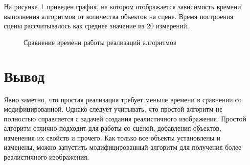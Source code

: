 На рисунке~\ref{fig:graph} приведен график, на котором отображается зависимость времени выполнения алгоритмов от количества объектов на сцене.  Время построения сцены рассчитывалось как среднее значение из 20 измерений.
\begin{figure}[ht!]
	\begin{center}
		\captionsetup{singlelinecheck = false, justification=centerfirst}
		\centering
		\caption{Сравнение времени работы реализаций алгоритмов}
		\label{fig:graph}
	\end{center}
\end{figure}

\section*{Вывод}
Явно заметно, что простая реализация требует меньше времени в сравнении со модифицированной. 
Однако следует учитывать, что простой алгоритм не полностью справляется с задачей создания реалистичного изображения. 
Простой алгоритм отлично подходит для работы со сценой, добавления объектов, изменения их свойств и прочего. 
Как только все объекты установлены и изменены, можно запустить модифицированный алгоритм для получения более реалистичного изображения.